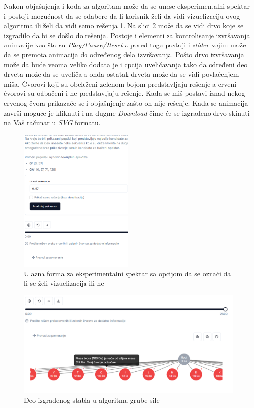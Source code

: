 \documentclass[12pt,oneside]{memoir}
\begin{document}
Nakon objašnjenja i koda za algoritam može da se unese eksperimentalni spektar i postoji mogućnost da se odabere da li korisnik želi da vidi vizuelizaciju ovog algoritma ili želi da vidi samo rešenja \ref{fig:brute_force_2}. Na slici \ref{fig:brute_force_4} može da se vidi drvo koje se izgradilo da bi se došlo do rešenja. Postoje i elementi za kontrolisanje izvršavanja animacije kao što su \emph{Play/Pause/Reset} a pored toga postoji i \emph{slider} kojim može da se premota animacija do određenog dela izvršavanja. Pošto drvo izvršavanja može da bude veoma veliko dodata je i opcija uveličavanja tako da određeni deo drveta može da se uveliča a onda ostatak drveta može da se vidi povlačenjem miša. Čvorovi koji su obeleženi zelenom bojom predstavljaju rešenje a crveni čvorovi su odbačeni i ne predstavljaju rešenje. Kada se miš postavi iznad nekog crvenog čvora prikazaće se i objašnjenje zašto on nije rešenje.
Kada se animacija završi moguće je kliknuti i na dugme \emph{Download} čime će se izgrađeno drvo skinuti na Vaš računar u \emph{SVG} formatu.
\clearpage
\begin{figure}[H]
\centering
\includegraphics[width=0.5\textwidth]{images/brute_force_2.png}
\caption{Ulazna forma za eksperimentalni spektar sa opcijom da se označi da li se želi vizuelizacija ili ne}
\label{fig:brute_force_2}
\end{figure}

\begin{figure}[H]
\centering
\includegraphics[width=1\textwidth]{images/brute_force_4.png}
\caption{Deo izgrađenog stabla u algoritmu grube sile}
\label{fig:brute_force_4}
\end{figure}
\end{document}
